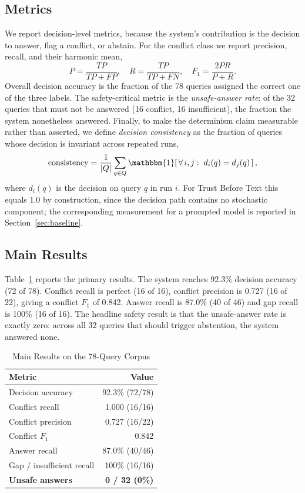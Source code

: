 \documentclass[conference]{IEEEtran}
\begin{document}
\subsection{Metrics}
We report decision-level metrics, because the system's contribution is the
decision to answer, flag a conflict, or abstain. For the conflict class we
report precision, recall, and their harmonic mean,
\begin{equation}
P = \frac{TP}{TP+FP}, \quad
R = \frac{TP}{TP+FN}, \quad
F_1 = \frac{2PR}{P+R}.
\label{eq:prf}
\end{equation}
Overall decision accuracy is the fraction of the 78 queries assigned the
correct one of the three labels. The safety-critical metric is the
\textit{unsafe-answer rate}: of the 32 queries that must not be answered
(16 conflict, 16 insufficient), the fraction the system nonetheless
answered. Finally, to make the determinism claim measurable rather than
asserted, we define \textit{decision consistency} as the fraction of
queries whose decision is invariant across repeated runs,
\begin{equation}
\mathrm{consistency} = \frac{1}{|Q|}\sum_{q \in Q}
\mathbbm{1}\!\left[\,\forall\,i,j:\; d_i(q) = d_j(q)\,\right],
\label{eq:consistency}
\end{equation}
where $d_i(q)$ is the decision on query $q$ in run $i$. For Trust Before
Text this equals $1.0$ by construction, since the decision path contains no
stochastic component; the corresponding measurement for a prompted model is
reported in Section~\ref{sec:baseline}.

\subsection{Main Results}
Table~\ref{tab:results} reports the primary results. The system reaches
92.3\% decision accuracy (72 of 78). Conflict recall is perfect (16 of 16),
conflict precision is 0.727 (16 of 22), giving a conflict $F_1$ of 0.842.
Answer recall is 87.0\% (40 of 46) and gap recall is 100\% (16 of 16). The
headline safety result is that the unsafe-answer rate is exactly zero:
across all 32 queries that should trigger abstention, the system answered
none.

\begin{table}[htbp]
\caption{Main Results on the 78-Query Corpus}
\label{tab:results}
\centering
\small
\begin{tabularx}{\columnwidth}{@{}X r@{}}
\toprule
Metric & Value \\
\midrule
Decision accuracy         & 92.3\% (72/78) \\
Conflict recall           & 1.000 (16/16) \\
Conflict precision        & 0.727 (16/22) \\
Conflict $F_1$            & 0.842 \\
Answer recall             & 87.0\% (40/46) \\
Gap / insufficient recall & 100\% (16/16) \\
\textbf{Unsafe answers}   & \textbf{0 / 32 (0\%)} \\
\bottomrule
\end{tabularx}
\end{table}
\end{document}
